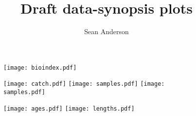 \documentclass[12pt]{article}
\title{Draft data-synopsis plots}
\author{Sean Anderson}
\begin{document}




\textheight 26cm



% 

\begin{figure}[htp]

  \parbox{\textwidth}{
    \parbox{2.5in}{%
         \texttt{[image: bioindex.pdf]}
    }
    \parbox{3in}{%
       \texttt{[image: catch.pdf]}
       \texttt{[image: samples.pdf]}
       \texttt{[image: samples.pdf]}
    }
  }



    \texttt{[image: ages.pdf]}
    \texttt{[image: lengths.pdf]}


\end{figure}

\end{document}
